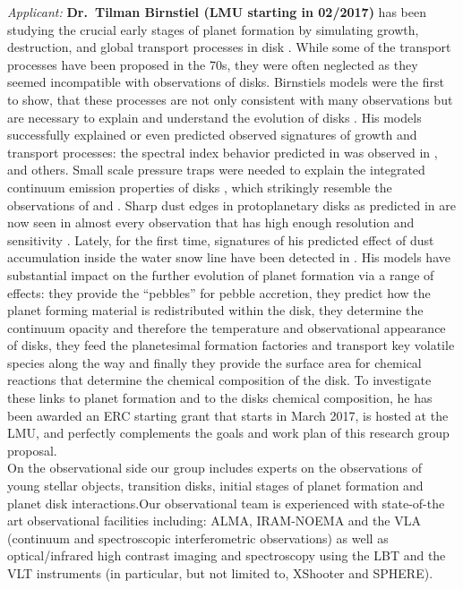 \documentclass[10pt,fleqn,twoside]{article}
\begin{document}
\textit{Applicant:} \textbf{Dr.\ Tilman Birnstiel (LMU starting in 02/2017)} has been
studying the crucial early stages of planet formation by simulating growth,
destruction, and global transport processes in disk
\citep[e.g.][]{2010A&A...513A..79B}. While some of the transport processes have
been proposed in the 70s, they were often neglected as they seemed incompatible
with observations of disks. Birnstiels models were the first to show, that these
processes are not only consistent with many observations but are necessary to
explain and understand the evolution of disks \citep{2010A&A...516L..14B}. His
models successfully explained or even predicted observed signatures of growth
and transport processes: the spectral index behavior predicted in
\citet{2010A&A...516L..14B} was observed in \citet{2012ApJ...760L..17P},
\citet{2016A&A...588A..53T} and others. Small scale pressure traps were needed
to explain the integrated continuum emission properties of disks
\citep{2012A&A...538A.114P}, which strikingly resemble the observations of
\citet{2015ApJ...808L...3A} and \citet{2016ApJ...820L..40A}. Sharp dust edges in
protoplanetary disks as predicted in \citet{2014ApJ...780..153B} are now seen in
almost every observation that has high enough resolution and sensitivity
\citep[e.g.][]{2016ApJ...820L..40A,2013A&A...557A.133D}. Lately, for the first
time, signatures of his predicted effect of dust accumulation inside the water
snow line \citet{2010A&A...513A..79B} have been detected in
\citet{2016Natur.535..258C}. His models have substantial impact on the further
evolution of planet formation via a range of effects: they provide the
``pebbles'' for pebble accretion, they predict how the planet forming material
is redistributed within the disk, they determine the continuum opacity and
therefore the temperature and observational appearance of disks, they feed the
planetesimal formation factories and transport key volatile species along the
way and finally they provide the surface area for chemical reactions that determine the
chemical composition of the disk. To investigate these links to planet formation
and to the disks chemical composition, he has been awarded an ERC starting grant
that starts in March 2017, is hosted at the LMU, and perfectly complements
the goals and work plan of this research group proposal.\\

 On the observational side our group includes experts on the
 observations of young stellar objects, transition disks, initial stages of
 planet formation and planet disk interactions.Our observational team
 is experienced with state-of-the art observational facilities
 including: ALMA, IRAM-NOEMA and the VLA (continuum and spectroscopic
 interferometric observations) as well as optical/infrared high
 contrast imaging and spectroscopy using the LBT and the VLT
 instruments (in particular, but not limited to, XShooter and
 SPHERE).\\ 
\end{document}
